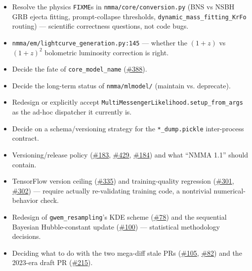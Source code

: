 \documentclass[10pt]{article}
\newcommand{\code}[1]{\texttt{#1}}
\begin{document}
\begin{itemize}
\item Resolve the physics \code{FIXME}s in \code{nmma/core/conversion.py} (BNS vs
  NSBH GRB ejecta fitting, prompt-collapse thresholds,
  \code{dynamic\_mass\_fitting\_KrFo} routing) --- scientific correctness
  questions, not code bugs.
\item \code{nmma/em/lightcurve\_generation.py:145} --- whether the $(1+z)$ vs
  $(1+z)^2$ bolometric luminosity correction is right.
\item Decide the fate of \code{core\_model\_name} (\href{https://github.com/nuclear-multimessenger-astronomy/nmma/issues/388}{\#388}).
\item Decide the long-term status of \code{nmma/mlmodel/} (maintain vs.
  deprecate).
\item Redesign or explicitly accept
  \code{MultiMessengerLikelihood.setup\_from\_args} as the ad-hoc dispatcher it
  currently is.
\item Decide on a schema/versioning strategy for the \code{*\_dump.pickle}
  inter-process contract.
\item Versioning/release policy (\href{https://github.com/nuclear-multimessenger-astronomy/nmma/issues/183}{\#183}, \href{https://github.com/nuclear-multimessenger-astronomy/nmma/issues/429}{\#429}, \href{https://github.com/nuclear-multimessenger-astronomy/nmma/issues/184}{\#184}) and what ``NMMA 1.1'' should
  contain.
\item TensorFlow version ceiling (\href{https://github.com/nuclear-multimessenger-astronomy/nmma/issues/335}{\#335}) and training-quality regression (\href{https://github.com/nuclear-multimessenger-astronomy/nmma/issues/301}{\#301},
  \href{https://github.com/nuclear-multimessenger-astronomy/nmma/issues/302}{\#302}) --- require actually re-validating training code, a nontrivial
  numerical-behavior check.
\item Redesign of \code{gwem\_resampling}'s KDE scheme (\href{https://github.com/nuclear-multimessenger-astronomy/nmma/issues/78}{\#78}) and the sequential
  Bayesian Hubble-constant update (\href{https://github.com/nuclear-multimessenger-astronomy/nmma/issues/100}{\#100}) --- statistical methodology decisions.
\item Deciding what to do with the two mega-diff stale PRs (\href{https://github.com/nuclear-multimessenger-astronomy/nmma/issues/105}{\#105}, \href{https://github.com/nuclear-multimessenger-astronomy/nmma/issues/82}{\#82}) and the
  2023-era draft PR (\href{https://github.com/nuclear-multimessenger-astronomy/nmma/issues/215}{\#215}).

\end{itemize}
\end{document}
